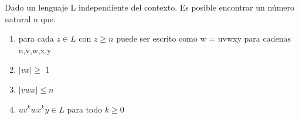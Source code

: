 \documentclass[a4paper,9pt]{extarticle}
\begin{document}
\begin{multicols*}{2}
Dado un lenguaje L independiente del contexto. Es posible encontrar un número natural n que.

\begin{enumerate}
\item para cada $ z \in L $ con $z \geq n$ puede ser escrito como w = uvwxy para cadenas u,v,w,x,y
\item $|vx| \geq$ 1
\item $|vwx| \leq n $
\item $uv^k wx^k y \in L$ para todo $k \geq 0$
\end{enumerate}


\end{multicols*}
\end{document}
